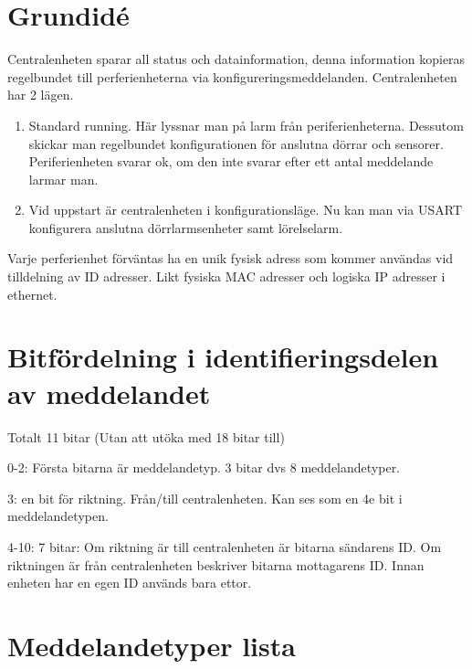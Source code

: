 \section*{Grundidé}
\label{sec:grundide}

Centralenheten sparar all status och datainformation, denna information kopieras regelbundet till perferienheterna via konfigureringsmeddelanden. Centralenheten har 2 lägen.

\begin{enumerate}
	\item Standard running. Här lyssnar man på larm från periferienheterna. Dessutom skickar man regelbundet  konfigurationen för anslutna dörrar och sensorer. Periferienheten svarar ok, om den inte svarar efter ett antal meddelande larmar man.
	\item Vid uppstart är centralenheten i konfigurationsläge. Nu kan man via USART konfigurera anslutna dörrlarmsenheter samt lörelselarm.
\end{enumerate}

Varje perferienhet förväntas ha en unik fysisk adress som kommer användas vid tilldelning av ID adresser. Likt fysiska MAC adresser och logiska IP adresser i ethernet.

\section*{Bitfördelning i identifieringsdelen av meddelandet}
\label{sec:bitfördelning}

Totalt 11 bitar (Utan att utöka med 18 bitar till)
\begin{description}
	\item{0-2:} Första bitarna är meddelandetyp. 3 bitar dvs 8 meddelandetyper.
	\item{3:} en bit för riktning. Från/till centralenheten. Kan ses som en 4e bit i meddelandetypen.
	\item{4-10:} 7 bitar:
		Om riktning är till centralenheten är bitarna sändarens ID.
		Om riktningen är från centralenheten beskriver bitarna mottagarens ID.
		Innan enheten har en egen ID används bara ettor.
\end{description}


\section*{Meddelandetyper lista}
\label{sec:meddelandetyper}


